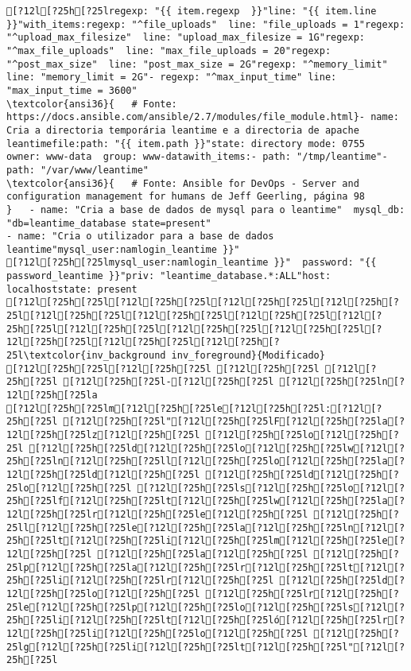 \documentclass{scrartcl}
\begin{document}
\begin{Verbatim}
[?12l[?25h[?25lregexp: "{{ item.regexp  }}"line: "{{ item.line }}"with_items:regexp: "^file_uploads"  line: "file_uploads = 1"regexp: "^upload_max_filesize"  line: "upload_max_filesize = 1G"regexp: "^max_file_uploads"  line: "max_file_uploads = 20"regexp: "^post_max_size"  line: "post_max_size = 2G"regexp: "^memory_limit"  line: "memory_limit = 2G"- regexp: "^max_input_time" line: "max_input_time = 3600"
\textcolor{ansi36}{   # Fonte: https://docs.ansible.com/ansible/2.7/modules/file_module.html}- name: Cria a directoria temporária leantime e a directoria de apache leantimefile:path: "{{ item.path }}"state: directory mode: 0755    owner: www-data  group: www-datawith_items:- path: "/tmp/leantime"- path: "/var/www/leantime"
\textcolor{ansi36}{   # Fonte: Ansible for DevOps - Server and configuration management for humans de Jeff Geerling, página 98
}   - name: "Cria a base de dados de mysql para o leantime"  mysql_db: "db=leantime_database state=present"
- name: "Cria o utilizador para a base de dados leantime"mysql_user:namlogin_leantime }}"
[?12l[?25h[?25lmysql_user:namlogin_leantime }}"  password: "{{ password_leantime }}"priv: "leantime_database.*:ALL"host: localhoststate: present
[?12l[?25h[?25l[?12l[?25h[?25l[?12l[?25h[?25l[?12l[?25h[?25l[?12l[?25h[?25l[?12l[?25h[?25l[?12l[?25h[?25l[?12l[?25h[?25l[?12l[?25h[?25l[?12l[?25h[?25l[?12l[?25h[?25l[?12l[?25h[?25l[?12l[?25h[?25l[?12l[?25h[?25l\textcolor{inv_background inv_foreground}{Modificado}
[?12l[?25h[?25l[?12l[?25h[?25l [?12l[?25h[?25l [?12l[?25h[?25l [?12l[?25h[?25l-[?12l[?25h[?25l [?12l[?25h[?25ln[?12l[?25h[?25la
[?12l[?25h[?25lm[?12l[?25h[?25le[?12l[?25h[?25l:[?12l[?25h[?25l [?12l[?25h[?25l"[?12l[?25h[?25lF[?12l[?25h[?25la[?12l[?25h[?25lz[?12l[?25h[?25l [?12l[?25h[?25lo[?12l[?25h[?25l [?12l[?25h[?25ld[?12l[?25h[?25lo[?12l[?25h[?25lw[?12l[?25h[?25ln[?12l[?25h[?25ll[?12l[?25h[?25lo[?12l[?25h[?25la[?12l[?25h[?25ld[?12l[?25h[?25l [?12l[?25h[?25ld[?12l[?25h[?25lo[?12l[?25h[?25l [?12l[?25h[?25ls[?12l[?25h[?25lo[?12l[?25h[?25lf[?12l[?25h[?25lt[?12l[?25h[?25lw[?12l[?25h[?25la[?12l[?25h[?25lr[?12l[?25h[?25le[?12l[?25h[?25l [?12l[?25h[?25ll[?12l[?25h[?25le[?12l[?25h[?25la[?12l[?25h[?25ln[?12l[?25h[?25lt[?12l[?25h[?25li[?12l[?25h[?25lm[?12l[?25h[?25le[?12l[?25h[?25l [?12l[?25h[?25la[?12l[?25h[?25l [?12l[?25h[?25lp[?12l[?25h[?25la[?12l[?25h[?25lr[?12l[?25h[?25lt[?12l[?25h[?25li[?12l[?25h[?25lr[?12l[?25h[?25l [?12l[?25h[?25ld[?12l[?25h[?25lo[?12l[?25h[?25l [?12l[?25h[?25lr[?12l[?25h[?25le[?12l[?25h[?25lp[?12l[?25h[?25lo[?12l[?25h[?25ls[?12l[?25h[?25li[?12l[?25h[?25lt[?12l[?25h[?25ló[?12l[?25h[?25lr[?12l[?25h[?25li[?12l[?25h[?25lo[?12l[?25h[?25l [?12l[?25h[?25lg[?12l[?25h[?25li[?12l[?25h[?25lt[?12l[?25h[?25l"[?12l[?25h[?25l

\end{Verbatim}
\end{document}
